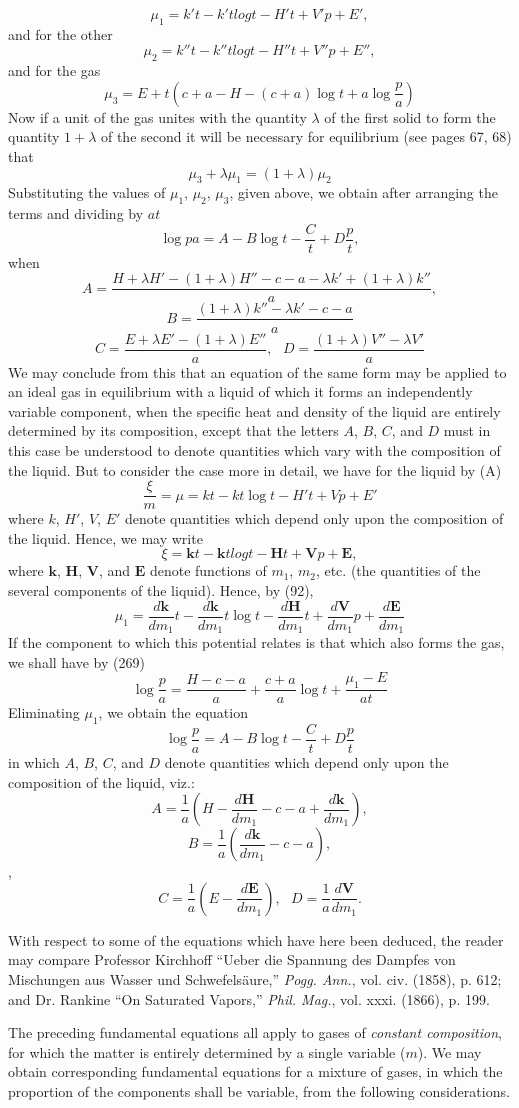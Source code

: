 \documentclass[12pt]{memoir}
\begin{document}
{$$\mu_1=  k't - k't log t - H't + V'p + E',$$
and for the other
$$\mu_2= k''t - k''t log t - H''t + V''p + E'',$$
and for the gas
$$\mu_3= E+t\left(c+a-H-(c+a) \log t+ a \log \frac{p}{a}\right)$$
Now if a unit of the gas unites with the quantity $\lambda$ of the first solid to form the quantity $1 +\lambda $ of the second it will be necessary for equilibrium (see pages 67, 68) that
$$ \mu_3 + \lambda \mu_1=(1 +\lambda) \mu_2$$
Substituting the values of $\mu_1$, $\mu_2$, $\mu_3$, given above, we obtain after arranging the terms and dividing by $at$
$$\log{p}{a} = A -B \log t -\frac{C}{t} + D \frac{p}{t},  $$
when
$$ A= \frac{H+\lambda H' -(1 + \lambda)H''-c-a-\lambda k' + (1+\lambda)k''}{a},$$
$$B=\frac{(1+\lambda)k''-\lambda k' -c - a}{a}$$
$$C= \frac{E+\lambda E'- (1+\lambda)E''}{a} , \ \ \     D=\frac{(1 +\lambda) V''- \lambda V'}{a}$$
We may conclude from this that an equation of the same form may be applied to an ideal gas in equilibrium with a liquid of which it forms an independently variable component, when the specific heat and density of the liquid are entirely determined by its composition, except that the letters $A$, $B$, $C$, and $D$ must in this case be understood to denote quantities which vary with the composition of the liquid. But to consider the case more in detail, we have for the liquid by (A)
$$\frac{\xi}{m}= \mu = kt - kt \log t - H't + Vp + E'$$
where $k$, $H'$, $V$, $E'$ denote quantities which depend only upon the composition of the liquid. Hence, we may write
$$\xi=\mathbf{k}t - \mathbf{k}t log t - \mathbf{H}t + \mathbf{V}p + \mathbf{E},$$
where $\mathbf{k}$, $\mathbf{H}$, $\mathbf{V}$, and $\mathbf{E}$ denote functions of $m_1$, $m_2$, etc. (the quantities of the several components of the liquid). Hence, by (92),
$$\mu_1 = \frac{d\mathbf{k}}{dm_1 } t- \frac{d\mathbf{k}}{dm_1} t\log t -
\frac{d\mathbf{H}}{dm_1 } t + \frac{d\mathbf{V}}{dm_1 }p+\frac{d\mathbf{E}}{dm_1 } $$
If the component to which this potential relates is that which also forms the gas, we shall have by (269)
$$\log \frac{p}{a}=\frac{H-c-a}{a} + \frac{c+a}{a} \log t + \frac{\mu_1-E}{at} $$
Eliminating $\mu_1$, we obtain the equation
$$\log\frac{p}{a}=A - B \log t - \frac{C}{t} + D \frac{p}{t}$$
in which $A$, $B$, $C$, and $D$ denote quantities which depend only upon the composition of the liquid, viz.:
$$A =  \frac{1}{a} \left(H- \frac{d\mathbf{H}}{dm_1}-c-a +\frac{d\mathbf{k}}{dm_1}\right),$$
$$B=  \frac{1}{a} \left( \frac{d\mathbf{k}}{dm_1}-c-a\right),$$,
$$C=\frac{1}{a} \left(E - \frac{d\mathbf{E}}{dm_1}\right), \ \ \  D=\frac{1}{a} \frac{d\mathbf{V}}{dm_1}.$$
\par With respect to some of the equations which have here been deduced, the reader may compare Professor Kirchhoff ``Ueber die Spannung des Dampfes von Mischungen aus Wasser und Schwefelsäure,'' \textit{Pogg. Ann.}, vol. civ. (1858), p. 612; and Dr. Rankine ``On Saturated Vapors,'' \textit{Phil. Mag.}, vol. xxxi. (1866), p. 199.}
\par The preceding fundamental equations all apply to gases of \textit{constant composition}, for which the matter is entirely determined by a single variable ($m$). We may obtain corresponding fundamental equations for a mixture of gases, in which the proportion of the components shall be variable, from  the following considerations.
\end{document}
